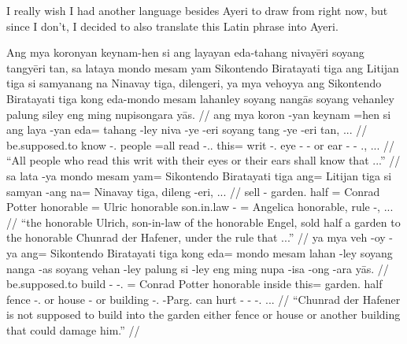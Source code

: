 \documentclass[12pt,paper=a4]{scrartcl}
\begin{document}
	I really wish I had another language besides Ayeri to draw from right 
	now, but since I don't, I decided to also translate this Latin phrase 
	into Ayeri.


\pex
	\glpreamble Ang mya koronyan keynam-hen si ang layayan eda-tahang 
		nivayēri soyang tangyēri tan, sa lataya mondo mesam yam 
		Sikontendo Biratayati tiga ang Litijan tiga si samyanang na 
		Ninavay tiga, dilengeri, ya mya vehoyya ang Sikontendo 
		Biratayati tiga kong eda-mondo mesam lahanley soyang nangās 
		soyang vehanley palung siley eng ming nupisongara yās. //
	\a \begingl
		\gla ang mya koron -yan keynam =hen si ang laya -yan eda= tahang 
			-ley niva -ye -eri soyang tang -ye -eri tan, ... //
		\glb \AgtT{} be.supposed.to know -\Tpl{}.\M{} people =all \Rel{} 
			\AgtT{} read -\Tpl{}.\M{}.\Top{} this= writ 
			-\Parg{}.\Inan{} eye -\Pl{} -\Ins{} or ear -\Pl{} 
			-\Ins{} \Tpl{}.\Gen{}, ... //
		\glft \enquote{All people who read this writ with their eyes or 
			their ears shall know that ...} //
	\endgl
	\a \begingl
		\gla sa lata -ya mondo mesam yam= Sikontendo Biratayati tiga 
			ang= Litijan tiga si samyan -ang na= Ninavay tiga, 
			dileng -eri, ... //
		\glb \PatT{} sell -\Tsg{} garden.\Top{} half \Dat{}= Conrad 
			Potter honorable \Aarg{}= Ulric honorable \Rel{} 
			son.in.law -\Aarg{} \Gen{}= Angelica honorable, rule 
			-\Ins{}, ... //
		\glft \enquote{the honorable Ulrich, son-in-law of the honorable 
			Engel, sold half a garden to the honorable Chunrad der 
			Hafener, under the rule that ...} //
	\endgl
	\a \begingl
		\gla ya mya veh -oy -ya ang= Sikontendo Biratayati tiga kong 
			eda= mondo mesam lahan -ley soyang nanga -as soyang 
			vehan -ley palung si -ley eng ming nupa -isa -ong -ara 
			yās. //
		\glb \LocT{} be.supposed.to build -\Neg{} -\Tsg{}.\M{} \Aarg{}= 
			Conrad Potter honorable inside this= garden.\Top{} half 
			fence -\Parg{}.\Inan{} or house -\Parg{} or building 
			-\Parg{}.\Inan{} \Rel{} -Parg{}.\Inan{} can hurt 
			-\Caus{} -\Irr{} -\Tsg{}.\Inan{} \Tsg{}.\M{}.\Parg{}. //
		\glft \enquote{Chunrad der Hafener is not supposed to build into 
		the garden either fence or house or another building that could 
		damage him.} //
	\endgl
\xe
\end{document}
